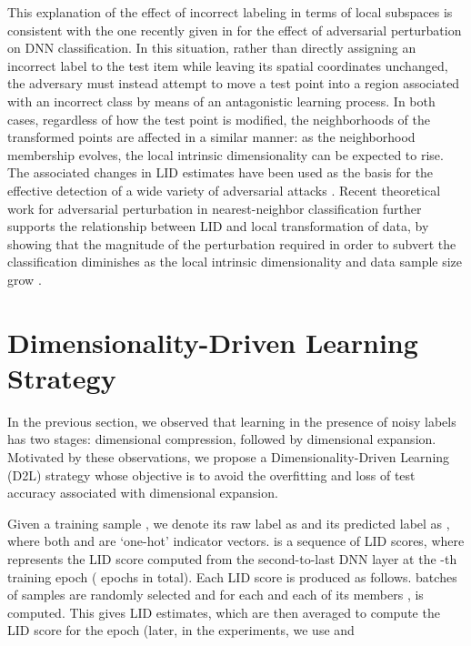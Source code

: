 \documentclass{article}
\begin{document}
This explanation of the effect of incorrect labeling in terms of local subspaces is consistent with the one recently given in \cite{ma2018characterizing} for the effect of adversarial perturbation on DNN classification. 
In this situation, rather than directly assigning an incorrect label to the test item while leaving its spatial coordinates unchanged, the adversary must instead attempt to move a test point into a region associated with an incorrect class by means of an antagonistic learning process. 
In both cases, regardless of how the test point is modified, the neighborhoods of the transformed points are affected in a similar manner: as the neighborhood membership evolves, the local intrinsic dimensionality can be expected to rise. The associated changes in LID estimates have been used as the basis for the effective detection of a wide variety of adversarial attacks \citep{ma2018characterizing}.
Recent theoretical work for adversarial perturbation in nearest-neighbor classification further supports the relationship between LID and local transformation of data, by showing that the magnitude of the perturbation required in order to subvert the classification diminishes as the local intrinsic dimensionality and data sample size grow \citep{advperturbWIFS17}.



\section{Dimensionality-Driven Learning Strategy}
\label{sec:manifold-learning}
In the previous section, we observed that learning in the presence of noisy labels has two stages: dimensional compression, followed by dimensional expansion. Motivated by these observations, we propose a Dimensionality-Driven Learning (D2L) strategy whose objective is to avoid the overfitting and loss of test accuracy associated with dimensional expansion. 

Given a training sample , we denote its raw label as  and its predicted label as , where both  and  are `one-hot' indicator vectors.  is a sequence of LID scores, where  represents the LID score computed from the second-to-last DNN layer at the -th training epoch ( epochs in total). Each LID score is produced as follows.    batches of samples are randomly selected  and for each  and each of its members ,  is computed.    This gives  LID estimates, which are then averaged to compute the LID score for the epoch (later, in the experiments, we use  and 
\end{document}

